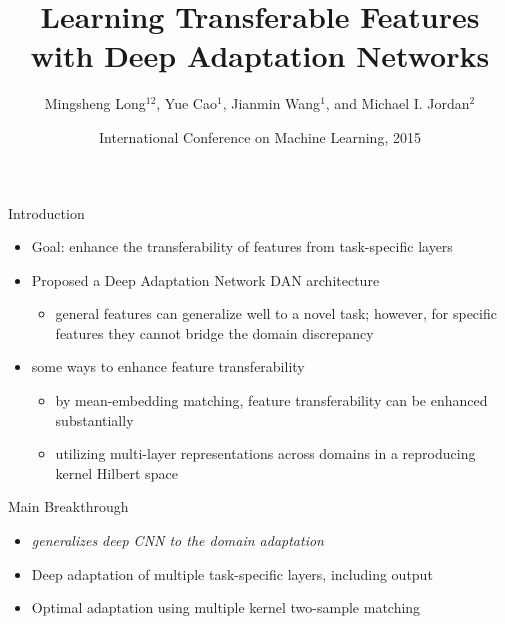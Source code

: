 \documentclass{beamer}
\author[PIN-CHUN, HSU]{ Mingsheng Long$^{12}$, Yue Cao$^1$, Jianmin Wang$^1$, and Michael I. Jordan$^2$ }
\title[Deep Adaptation Networks]{\LARGE Learning Transferable Features with Deep
Adaptation Networks}
\date[May 17, 2017]{International Conference on Machine Learning, 2015}
\begin{document}
\frame{\titlepage}

\begin{frame}[fragile]{Introduction}
\begin{itemize}
\item{Goal: enhance the transferability of features from task-specific layers}
\item{Proposed a Deep Adaptation Network DAN architecture}
  \begin{itemize}
    \item{general features can generalize well to a novel task; however, for specific features they cannot bridge the domain discrepancy}
  \end{itemize}

\item{some ways to enhance feature transferability}
  \begin{itemize}
    \item{by mean-embedding matching, feature transferability can be enhanced substantially}
    \item{utilizing multi-layer representations across domains in a reproducing kernel Hilbert space}
  \end{itemize}
\end{itemize}
\end{frame}

\begin{frame}[fragile]{Main Breakthrough}
\begin{itemize}
\item{\emph{generalizes deep CNN to the domain adaptation}}
\item{Deep adaptation of multiple task-specific layers, including output}
\item{Optimal adaptation using multiple kernel two-sample matching}
\end{itemize}
\end{frame}
\end{document}
